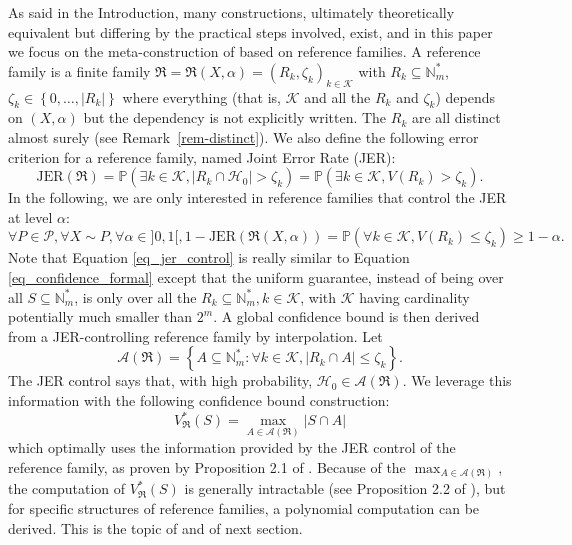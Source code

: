 \documentclass[
  11pt,
  a4paper,
]{article}
\theoremstyle{definition}
\theoremstyle{plain}
\theoremstyle{plain}
\theoremstyle{plain}
\theoremstyle{definition}
\theoremstyle{remark}
\begin{document}
As said in the Introduction, many constructions, ultimately
theoretically equivalent but differing by the practical steps involved,
exist, and in this paper we focus on the meta-construction of
\citet{MR4124323} based on reference families. A reference family is a
finite family
\(\mathfrak{R}=\mathfrak{R}(X,\alpha)=(R_k,\zeta_k)_{k\in \mathcal K}\)
with \(R_k\subseteq\mathbb{N}_m^*\),
\(\zeta_k\in\left\{0,\dotsc,|R_k|\right\}\) where everything (that is,
\(\mathcal K\) and all the \(R_k\) and \(\zeta_k\)) depends on
\((X,\alpha)\) but the dependency is not explicitly written. The \(R_k\)
are all distinct almost surely (see Remark~\ref{rem-distinct}). We also
define the following error criterion for a reference family, named Joint
Error Rate (JER): \begin{equation}
\mathrm{JER}(\mathfrak{R}) = \mathbb{P}\left(\exists k\in\mathcal K, |R_k\cap\mathcal{H}_0| > \zeta_k \right) = \mathbb{P}\left(\exists k\in\mathcal K, V(R_k) > \zeta_k \right).
\label{eq_jer}
\end{equation} In the following, we are only interested in reference
families that control the JER at level \(\alpha\): \begin{equation}
\forall P\in\mathcal P, \forall X\sim P, \forall \alpha \in ]0,1[, 1-\mathrm{JER}(\mathfrak{R}(X,\alpha))=\mathbb{P}\left(\forall k\in\mathcal K, V(R_k)\leq \zeta_k\right) \geq 1-\alpha.
\label{eq_jer_control}
\end{equation} Note that Equation \eqref{eq_jer_control} is really
similar to Equation \eqref{eq_confidence_formal} except that the uniform
guarantee, instead of being over all \(S\subseteq \mathbb{N}_m^*\), is
only over all the \(R_k\subseteq \mathbb{N}_m^*, k\in\mathcal K\), with
\(\mathcal K\) having cardinality potentially much smaller than \(2^m\).
A global confidence bound is then derived from a JER-controlling
reference family by interpolation. Let \begin{equation}
\mathcal A(\mathfrak{R})= \left\{A\subseteq \mathbb{N}_m^*:  \forall k\in\mathcal K, |R_k\cap A| \leq \zeta_k \right\}.
\label{eq_a}
\end{equation} The JER control says that, with high probability,
\(\mathcal{H}_0\in\mathcal A(\mathfrak{R})\). We leverage this
information with the following confidence bound construction:
\begin{equation}
V^*_{\mathfrak{R}}(S) = \max_{A\in\mathcal A(\mathfrak{R})}|S\cap A|
\label{eq-vstar}
\end{equation} which optimally uses the information provided by the JER
control of the reference family, as proven by Proposition 2.1 of
\citet{MR4124323}. Because of the
\(\max_{A\in\mathcal A(\mathfrak{R})}\), the computation of
\(V^*_{\mathfrak{R}}(S)\) is generally intractable (see Proposition 2.2
of \citet{MR4124323}), but for specific structures of reference
families, a polynomial computation can be derived. This is the topic of
\citet{MR4178188} and of next section.
\end{document}
